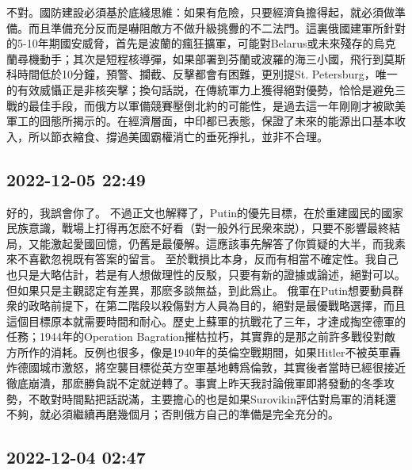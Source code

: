 \documentclass[twocolumn]{ctexart}
\begin{document}
不對。國防建設必須基於底綫思維：如果有危險，只要經濟負擔得起，就必須做準備。而且準備充分反而是嚇阻敵方不做升級挑釁的不二法門。這裏俄國建軍所針對的5-10年期國安威脅，首先是波蘭的瘋狂擴軍，可能對Belarus或未來殘存的烏克蘭尋機動手；其次是短程核導彈，如果部署到芬蘭或波羅的海三小國，飛行到莫斯科時間低於10分鐘，預警、攔截、反擊都會有困難，更別提St. Petersburg，唯一的有效威懾正是非核突擊；換句話説，在傳統軍力上獲得絕對優勢，恰恰是避免三戰的最佳手段，而俄方以軍備競賽壓倒北約的可能性，是過去這一年剛剛才被歐美軍工的囧態所揭示的。在經濟層面，中印都已表態，保證了未來的能源出口基本收入，所以節衣縮食、撐過美國霸權消亡的垂死掙扎，並非不合理。
\subsection*{2022-12-05 22:49}

好的，我誤會你了。
不過正文也解釋了，Putin的優先目標，在於重建國民的國家民族意識，戰場上打得再怎麽不好看（對一般外行民衆來説），只要不影響最終結局，又能激起愛國回憶，仍舊是最優解。這應該事先解答了你質疑的大半，而我素來不喜歡忽視既有答案的留言。
至於戰損比本身，反而有相當不確定性。我自己也只是大略估計，若是有人想做理性的反駁，只要有新的證據或論述，絕對可以。但如果只是主觀認定有差異，那麽多談無益，到此爲止。
俄軍在Putin想要動員群衆的政略前提下，在第二階段以殺傷對方人員為目的，絕對是最優戰略選擇，而且這個目標原本就需要時間和耐心。歷史上蘇軍的抗戰花了三年，才達成掏空德軍的任務；1944年的Operation Bagration摧枯拉朽，其實靠的是那之前許多戰役對敵方所作的消耗。反例也很多，像是1940年的英倫空戰期間，如果Hitler不被英軍轟炸德國城市激怒，將空襲目標從英方空軍基地轉爲倫敦，其實後者當時已經很接近徹底崩潰，那麽勝負説不定就逆轉了。事實上昨天我討論俄軍即將發動的冬季攻勢，不敢對時間點把話説滿，主要擔心的也是如果Surovikin評估對烏軍的消耗還不夠，就必須繼續再磨幾個月；否則俄方自己的準備是完全充分的。
\subsection*{2022-12-04 02:47}
\end{document}
